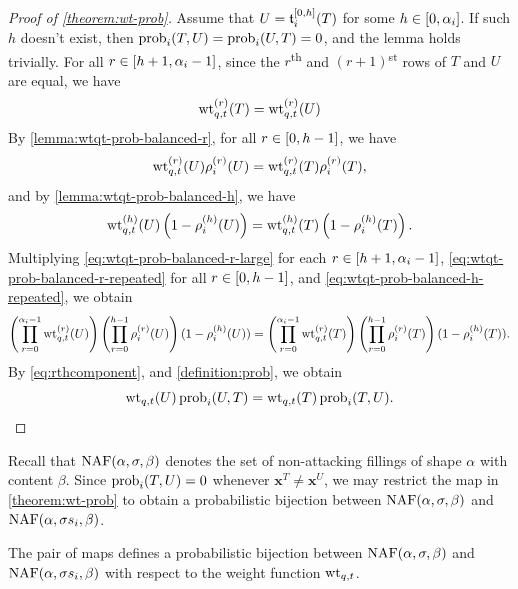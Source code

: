 \begin{proof}[Proof of \cref{theorem:wt-prob}]
	Assume that \(U = \sswap[0, h]{i}(T)\) for some \(h \in [0, \alpha_i]\).
	If such \(h\) doesn't exist, then \(\operatorname{prob}_{i}(T, U) = \operatorname{prob}_{i}(U, T) = 0\), and the lemma holds trivially.
	For all \(r \in [h + 1, \alpha_i-1]\),
	since the \(r\)\textsuperscript{th} and \((r+1)\)\textsuperscript{st} rows of \(T\) and \(U\) are equal,
	we have
	\begin{equation} \label{eq:wtqt-prob-balanced-r-large}
		\wtqt[r](T) = \wtqt[r](U)
	\end{equation}
	By \cref{lemma:wtqt-prob-balanced-r}, for all \(r \in [0, h-1]\), we have
	\begin{equation} \label{eq:wtqt-prob-balanced-r-repeated}
		\wtqt[r](U)\pp[r]{i}(U) = \wtqt[r](T)\pp[r]{i}(T),
	\end{equation}
	and by \cref{lemma:wtqt-prob-balanced-h}, we have
	\begin{equation} \label{eq:wtqt-prob-balanced-h-repeated}
		\wtqt[h](U)\left(1 - \pp[h]{i}(U)\right) = \wtqt[h](T)\left(1 - \pp[h]{i}(T)\right).
	\end{equation}
	Multiplying
	\eqref{eq:wtqt-prob-balanced-r-large} for each \(r \in [h + 1, \alpha_i-1]\),
	\eqref{eq:wtqt-prob-balanced-r-repeated} for all \(r \in [0, h-1]\), and
	\eqref{eq:wtqt-prob-balanced-h-repeated},
	we obtain
	\begin{equation*}
		\left( \prod_{r = 0}^{\alpha_i-1} \wtqt[r](U) \right)
		\left( \prod_{r = 0}^{h-1} \pp[r]{i}(U) \right)
		( 1 - \pp[h]{i}(U) )
		=
		\left( \prod_{r = 0}^{\alpha_i-1} \wtqt[r](T) \right)
		\left( \prod_{r = 0}^{h-1} \pp[r]{i}(T) \right)
		( 1 - \pp[h]{i}(T) ).
	\end{equation*}
	By \eqref{eq:rthcomponent}, and \cref{definition:prob}, we obtain
	\begin{equation*}
		\wtqt(U)\prob{i}(U, T) = \wtqt(T)\prob{i}(T, U). \qedhere
	\end{equation*}
\end{proof}

Recall that \(\NAF(\alpha, \sigma, \beta)\) denotes the set of non-attacking fillings of shape \(\alpha\) with content \(\beta\).
Since \(\operatorname{prob}_{i}(T, U) = 0\) whenever \(\mathbf{x}^T \neq \mathbf{x}^U\),
we may restrict the map in \cref{theorem:wt-prob}
to obtain a probabilistic bijection between
\(\NAF(\alpha, \sigma, \beta)\) and \(\NAF(\alpha, \sigma s_i, \beta)\).

\begin{corollary} \label{cor:wt-prob}
	The pair of maps
	defines a probabilistic bijection between
	\(\NAF(\alpha, \sigma, \beta)\) and \(\NAF(\alpha, \sigma s_i, \beta)\)
	with respect to the weight function \(\wtqt\).
\end{corollary}

